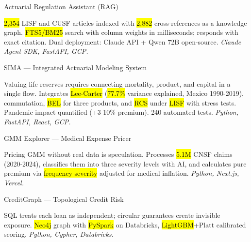 \documentclass[10pt, letterpaper]{awesome-cv}
\begin{document}
\begin{cventries}

  \cventry
    {Actuarial Regulation Assistant (RAG)}
    {}
    {}
    {}
    {
      \begin{cvitems}
        \item {\hl{2,354} LISF and CUSF articles indexed with \hl{2,882} cross-references as a knowledge graph. \hl{FTS5/BM25} search with column weights in milliseconds; responds with exact citation. Dual deployment: Claude API + Qwen 72B open-source. \textit{Claude Agent SDK, FastAPI, GCP.}}
      \end{cvitems}
    }

  \cventry
    {SIMA — Integrated Actuarial Modeling System}
    {}
    {}
    {}
    {
      \begin{cvitems}
        \item {Valuing life reserves requires connecting mortality, product, and capital in a single flow. Integrates \hl{Lee-Carter} (\hl{77.7\%} variance explained, Mexico 1990-2019), commutation, \hl{BEL} for three products, and \hl{RCS} under \hl{LISF} with stress tests. Pandemic impact quantified (+3-10\% premium). 240 automated tests. \textit{Python, FastAPI, React, GCP.}}
      \end{cvitems}
    }

  \cventry
    {GMM Explorer — Medical Expense Pricer}
    {}
    {}
    {}
    {
      \begin{cvitems}
        \item {Pricing GMM without real data is speculation. Processes \hl{5.1M} CNSF claims (2020-2024), classifies them into three severity levels with AI, and calculates pure premium via \hl{frequency-severity} adjusted for medical inflation. \textit{Python, Next.js, Vercel.}}
      \end{cvitems}
    }

  \cventry
    {CreditGraph — Topological Credit Risk}
    {}
    {}
    {}
    {
      \begin{cvitems}
        \item {SQL treats each loan as independent; circular guarantees create invisible exposure. \hl{Neo4j} graph with \hl{PySpark} on Databricks, \hl{LightGBM}+Platt calibrated scoring. \textit{Python, Cypher, Databricks.}}
      \end{cvitems}
    }

\end{cventries}
\end{document}
